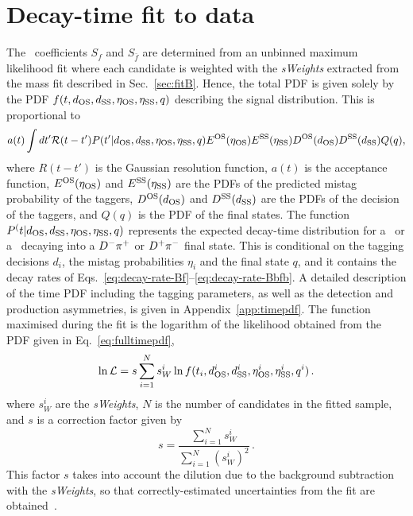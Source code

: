 \section{Decay-time fit to data}
\label{sec:datafit}

The \CP~coefficients $S_{f}$ and $S_{\bar f}$ are determined from an unbinned maximum likelihood fit
where each candidate is weighted with the \emph{sWeights} extracted from the mass fit described in
Sec.~\ref{sec:fitB}. Hence, the total PDF is given solely by the PDF \mbox{$f(t, d_{\rm OS}, d_{\rm SS} , \eta_{\rm OS}, \eta_{\rm SS}, q)$} describing the signal distribution. This is proportional to
\begin{equation}
	\label{eq:fulltimepdf}
       a(t) \int dt' \mathcal R(t-t') P(t' | d_{\rm OS}, d_{\rm SS}, \eta_{\rm OS}, \eta_{\rm SS}, q) E^{\rm OS}(\eta_{\rm OS}) E^{\rm SS}(\eta_{\rm SS}) D^{\rm OS}(d_{\rm OS}) D^{\rm SS}(d_{\rm SS}) Q(q),
\end{equation}
where $R(t-t')$ is the Gaussian resolution
function, $a(t)$ is the acceptance function, $E^{\rm OS}(\eta_{\rm OS})$ and $E^{\rm SS}(\eta_{\rm SS})$ are the PDFs of the predicted mistag probability of the taggers, $D^{\rm OS}(d_{\rm OS})$ and $D^{\rm SS}(d_{\rm SS})$ are the PDFs of the decision of the taggers, and
$Q(q)$ is the PDF of the final states.
The function $P^(t |  d_{\rm OS}, d_{\rm SS}, \eta_{\rm OS}, \eta_{\rm SS}, q)$ represents the expected decay-time distribution
for a \Bz~or a \Bzb~decaying into a $D^-\pi^+$ or $D^+\pi^-$ final state. This is conditional on the tagging
decisions $d_{i}$, the mistag probabilities $\eta_{i}$ and the final state $q$, and it contains the decay rates of
Eqs.~\ref{eq:decay-rate-Bf}--\ref{eq:decay-rate-Bbfb}. A detailed description of the time PDF including the
tagging parameters, as well as the detection and production asymmetries, is given in Appendix~\ref{app:timepdf}. 
The function maximised during the fit is the logarithm of the likelihood obtained from the PDF given in Eq.~\ref{eq:fulltimepdf}, 
\begin{equation}
	\ln\mathcal L = s \sum\limits_{i=1}^{N} s_W^i \ln f(t_i, d^i_{\rm OS}, d^i_{\rm SS} , \eta^i_{\rm OS}, \eta^i_{\rm SS}, q^i)\,.
\end{equation}
where $s_W^i$ are the \emph{sWeights}, $N$ is the number of candidates in the fitted sample, and $s$ is a correction factor given by
\begin{equation}
  \label{eq:sWeightsDilution}
  s = \frac{\sum\limits_{i=1}^{N} s_W^i}{\sum\limits_{i=1}^{N} \left(s_W^i\right)^2}\,.
\end{equation}
 This factor $s$ takes into account the dilution due to the background subtraction with the \emph{sWeights}, so that
 correctly-estimated uncertainties from the fit are obtained~\cite{sfit}.

